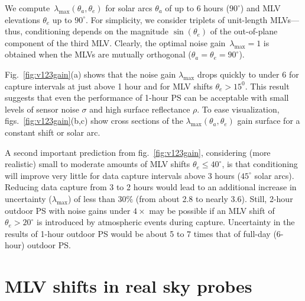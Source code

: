 

We compute~$\lambda_{\max}(\theta_a,\theta_e)$ for solar arcs $\theta_a$ of up to 6 hours ($90^\circ$) and MLV elevations $\theta_e$ up to $90^\circ$. For simplicity, we consider triplets of unit-length MLVs---thus, conditioning depends on the magnitude $\sin(\theta_e)$ of the out-of-plane component of the third MLV. Clearly, the optimal noise gain~$\lambda_{\max} = 1$ is obtained when the MLVs are mutually orthogonal ($\theta_a = \theta_e = 90^\circ$).

Fig.~\ref{fig:v123gain}(a) shows that the noise gain $\lambda_{\max}$ drops quickly to under 6 for capture intervals at just above 1 hour and for MLV shifts $\theta_e > 15^0$. This result suggests that even the performance of 1-hour PS can be acceptable with small levels of sensor noise $\sigma$ and high surface reflectance $\rho$. To ease visualization, figs.~\ref{fig:v123gain}(b,c) show cross sections of the $\lambda_{\max}(\theta_a,\theta_e)$ gain surface for a constant shift or solar arc.

A second important prediction from fig.~\ref{fig:v123gain}, considering (more realistic) small to moderate amounts of MLV shifts $\theta_e \leq 40^\circ$, is that conditioning will improve very little for data capture intervals above 3 hours ($45^\circ$ solar arcs). Reducing data capture from 3 to 2 hours would lead to an additional increase in uncertainty ($\lambda_{\max}$) of less than $30\%$ (from about 2.8 to nearly 3.6). Still, 2-hour outdoor PS with noise gains under $4\times$ may be possible if an MLV shift of $\theta_e > 20^\circ$ is introduced by atmospheric events during capture. Uncertainty in the results of 1-hour outdoor PS would be about 5 to 7 times that of full-day (6-hour) outdoor PS.


\section{MLV shifts in real sky probes}


